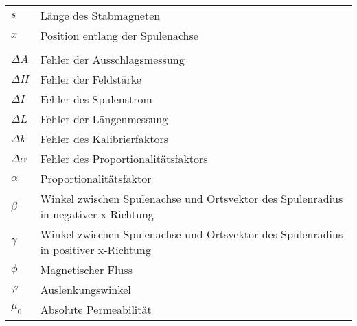 \begin{table}[h]
\begin{tabular}{@{}ll@{}}
        \(s\)           & Länge des Stabmagneten                                                              \\
        \(x\)           & Position entlang der Spulenachse \\
        & \\
        \(\Delta A\)  & Fehler der Ausschlagsmessung \\
        \(\Delta H\)  & Fehler der Feldstärke \\
        \(\Delta I\)  & Fehler des Spulenstrom \\
        \(\Delta L\)  & Fehler der Längenmessung \\
        \(\Delta k\) & Fehler des Kalibrierfaktors \\
        \(\Delta \alpha\) & Fehler des Proportionalitätsfaktors \\
        \(\alpha\)    & Proportionalitätsfaktor                                                               \\
        \(\beta\)     & Winkel zwischen Spulenachse und Ortsvektor des Spulenradius in negativer x-Richtung   \\
        \(\gamma\)    & Winkel zwischen Spulenachse und Ortsvektor des Spulenradius in positiver x-Richtung   \\
        \(\phi\)      & Magnetischer Fluss                                                                  \\
        \(\varphi\)   & Auslenkungswinkel                                                                   \\
        \(\mu_0\)     & Absolute Permeabilität                                                              \\
    \end{tabular}
\end{table}